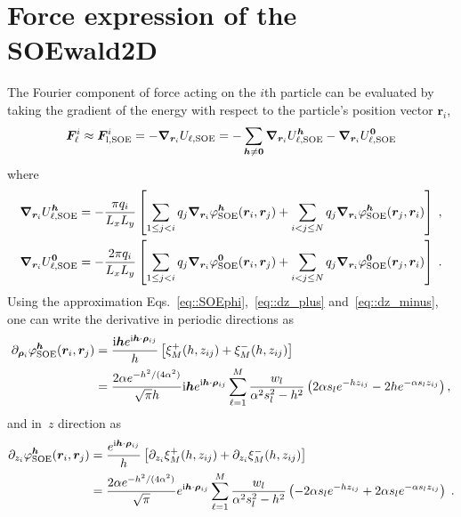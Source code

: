 \section{Force expression of the SOEwald2D} \label{app::force}

The Fourier component of force acting on the $i$th particle can be evaluated by taking the gradient of the energy with respect to the particle's position vector $\bm{r}_{i}$,
\begin{equation}\label{eq::Fi}
	\boldsymbol{F}_{\ell}^i  \approx \boldsymbol{F}^{i}_{\text{l},\text{SOE}} = -\boldsymbol{\nabla}_{\boldsymbol{r}_{i}} U_{\ell,\text{SOE}} =  -\sum_{\bm{h}\neq \bm{0}} \boldsymbol{\nabla}_{\boldsymbol{r}_{i}}U_{\ell,\text{SOE}}^{\boldsymbol{h}} -\boldsymbol{\nabla}_{\boldsymbol{r}_{i}} U_{\ell,\text{SOE}}^{\boldsymbol{0}}
\end{equation}
where
\begin{align}    
	\boldsymbol{\nabla}_{\boldsymbol{r}_{i}}U_{\ell,\text{SOE}}^{\boldsymbol{h}} &= - \frac{\pi q_{i}}{L_x L_y} \left[ \sum_{1 \leq j < i} q_{j} \boldsymbol{\nabla}_{\boldsymbol{r}_{i}} \varphi_{\text{SOE}}^{\boldsymbol{h}}(\boldsymbol{r}_{i}, \boldsymbol{r}_{j}) +  \sum_{i < j \leq N} q_{j} \boldsymbol{\nabla}_{\boldsymbol{r}_{i}} \varphi_{\text{SOE}}^{\boldsymbol{h}}(\boldsymbol{r}_{j}, \boldsymbol{r}_{i}) \right]\;,\\
	\boldsymbol{\nabla}_{\boldsymbol{r}_{i}} U_{\ell,\text{SOE}}^{\boldsymbol{0}} &= - \frac{2 \pi q_{i}}{L_x L_y} \left[ \sum_{1 \leq j < i} q_{j} \boldsymbol{\nabla}_{\boldsymbol{r}_{i}} \varphi^{\bm{0}}_{\text{SOE}}(\bm{r}_{i}, \bm{r}_{j}) + \sum_{i < j \leq N} q_{j} \boldsymbol{\nabla}_{\boldsymbol{r}_{i}} \varphi^{\bm{0}}_{\text{SOE}}(\bm{r}_{j}, \bm{r}_{i})\right]\;.
\end{align}
Using the approximation Eqs.~\eqref{eq::SOEphi},~\eqref{eq::dz_plus} and~\eqref{eq::dz_minus}, one can write the derivative in periodic directions as
\begin{equation}
	\begin{split}
		\partial_{\bm{\rho}_{i}} \varphi_{\text{SOE}}^{\boldsymbol{h}}(\boldsymbol{r}_{i}, \boldsymbol{r}_{j}) & = \frac{\mathrm{i} \boldsymbol{h} e^{ \mathrm{i} \boldsymbol{h} \cdot \boldsymbol{\rho}_{ij}}}{h} \left[\xi^{+}_M(h, z_{ij})+\xi^{-}_M(h, z_{ij})\right]\\
		&=\frac{2\alpha e^{-h^2/(4\alpha^2)}}{\sqrt{\pi}h} \mathrm{i} \bm{h}e^{\mathrm{i} \boldsymbol{h} \cdot \boldsymbol{\rho}_{ij}} \sum_{\ell = 1}^{M}  \frac{w_l}{\alpha^2 s_l^2 - h^2}\left( 2 \alpha s_l e^{-h z_{ij}} - 2 h e^{-\alpha s_l z_{ij}}\right),
	\end{split}
\end{equation}
and in~$z$ direction as
\begin{equation}\label{eq:z-der}
	\begin{split}
		\partial_{z_{i}} \varphi_{\text{SOE}}^{\boldsymbol{h}}(\boldsymbol{r}_{i}, \boldsymbol{r}_{j}) & = \frac{e^{\mathrm{i} \boldsymbol{h} \cdot \boldsymbol{\rho}_{ij}}}{h} \left[\partial_{z_{i}} \xi^{+}_M(h, z_{ij}) + \partial_{z_{i}} \xi^{-}_M(h, z_{ij})\right]\\
		&=\frac{2 \alpha e^{-h^2/(4\alpha^2)}}{\sqrt{\pi}}e^{ \mathrm{i} \boldsymbol{h} \cdot \boldsymbol{\rho}_{ij}} \sum_{\ell = 1}^{M}  \frac{w_l}{\alpha^2 s_l^2 - h^2}\left( - 2 \alpha s_l e^{-h z_{ij}} + 2 \alpha s_l e^{- \alpha s_l z_{ij}}\right)\;.
	\end{split}
\end{equation}
